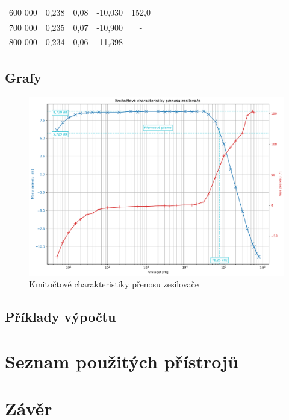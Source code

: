 \documentclass[a4paper, czech]{article}
\begin{document}
\begin{table}[H]
\begin{tabular}{rcccc}
        600 000     & 0,238                                                                       & 0,08                           & -10,030                                                      & 152,0                                                       \\
        700 000     & 0,235                                                                       & 0,07                           & -10,900                                                      & -                                                           \\
        800 000     & 0,234                                                                       & 0,06                           & -11,398                                                      & -                                                           \\
        \bottomrule
    \end{tabular}
\end{table}

\subsection{Grafy}

\begin{figure}[H]
    \centering
    \includegraphics[width=\textwidth]{grafy/graf_kmitoctova_charakteristika.pdf}
    \caption{Kmitočtové charakteristiky přenosu zesilovače}
\end{figure}

\subsection{Příklady výpočtu}

\section{Seznam použitých přístrojů}

\section{Závěr}
\end{document}
